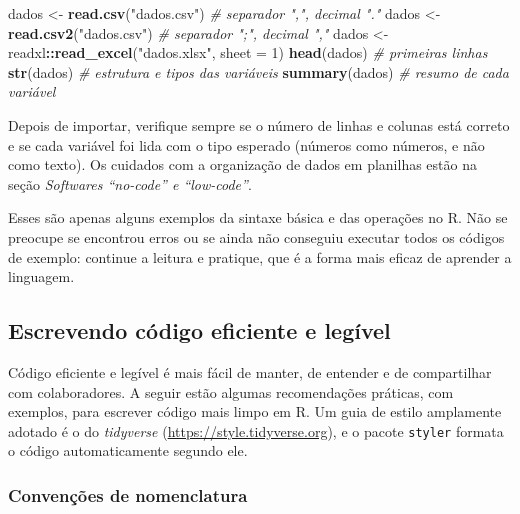 \documentclass[
]{book}
\newenvironment{Shaded}{\begin{snugshade}}{\end{snugshade}}
\newcommand{\AttributeTok}[1]{\textcolor[rgb]{0.13,0.29,0.53}{#1}}
\newcommand{\CommentTok}[1]{\textcolor[rgb]{0.56,0.35,0.01}{\textit{#1}}}
\newcommand{\DecValTok}[1]{\textcolor[rgb]{0.00,0.00,0.81}{#1}}
\newcommand{\FunctionTok}[1]{\textcolor[rgb]{0.13,0.29,0.53}{\textbf{#1}}}
\newcommand{\NormalTok}[1]{#1}
\newcommand{\OtherTok}[1]{\textcolor[rgb]{0.56,0.35,0.01}{#1}}
\newcommand{\SpecialCharTok}[1]{\textcolor[rgb]{0.81,0.36,0.00}{\textbf{#1}}}
\newcommand{\StringTok}[1]{\textcolor[rgb]{0.31,0.60,0.02}{#1}}
\begin{document}
\begin{Shaded}
\begin{Highlighting}[]
\NormalTok{dados }\OtherTok{\textless{}{-}} \FunctionTok{read.csv}\NormalTok{(}\StringTok{"dados.csv"}\NormalTok{)                  }\CommentTok{\# separador ",", decimal "."}
\NormalTok{dados }\OtherTok{\textless{}{-}} \FunctionTok{read.csv2}\NormalTok{(}\StringTok{"dados.csv"}\NormalTok{)                 }\CommentTok{\# separador ";", decimal ","}
\NormalTok{dados }\OtherTok{\textless{}{-}}\NormalTok{ readxl}\SpecialCharTok{::}\FunctionTok{read\_excel}\NormalTok{(}\StringTok{"dados.xlsx"}\NormalTok{, }\AttributeTok{sheet =} \DecValTok{1}\NormalTok{)}
\FunctionTok{head}\NormalTok{(dados)      }\CommentTok{\# primeiras linhas}
\FunctionTok{str}\NormalTok{(dados)       }\CommentTok{\# estrutura e tipos das variáveis}
\FunctionTok{summary}\NormalTok{(dados)   }\CommentTok{\# resumo de cada variável}
\end{Highlighting}
\end{Shaded}

Depois de importar, verifique sempre se o número de linhas e colunas está correto e se cada variável foi lida com o tipo esperado (números como números, e não como texto). Os cuidados com a organização de dados em planilhas estão na seção \emph{Softwares ``no-code'' e ``low-code''}.

Esses são apenas alguns exemplos da sintaxe básica e das operações no R. Não se preocupe se encontrou erros ou se ainda não conseguiu executar todos os códigos de exemplo: continue a leitura e pratique, que é a forma mais eficaz de aprender a linguagem.

\subsection{Escrevendo código eficiente e legível}\label{escrevendo-cuxf3digo-eficiente-e-leguxedvel}

Código eficiente e legível é mais fácil de manter, de entender e de compartilhar com colaboradores. A seguir estão algumas recomendações práticas, com exemplos, para escrever código mais limpo em R. Um guia de estilo amplamente adotado é o do \emph{tidyverse} (\url{https://style.tidyverse.org}), e o pacote \texttt{styler} formata o código automaticamente segundo ele.

\subsubsection{Convenções de nomenclatura}\label{convenuxe7uxf5es-de-nomenclatura}
\end{document}
